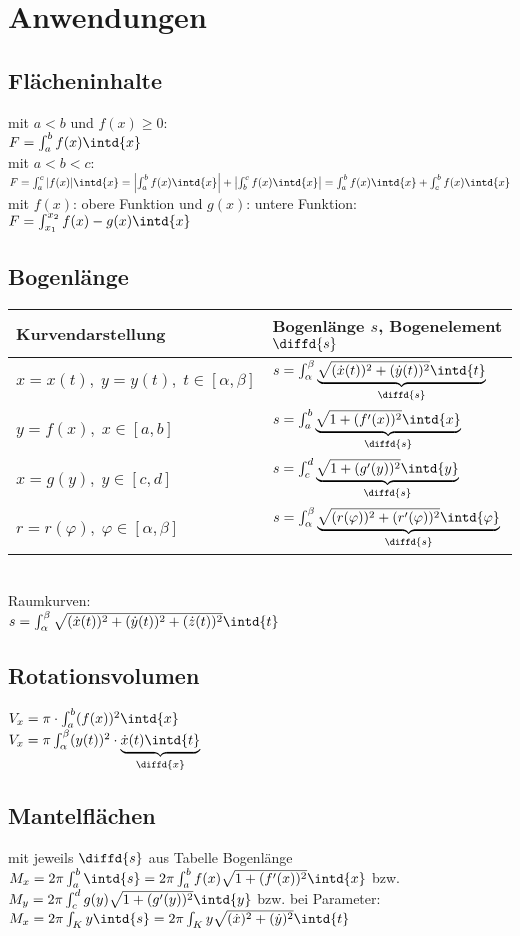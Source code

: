 \section{Anwendungen}
\subsection{Flächeninhalte}
mit $a<b$ und $f(x) \geq 0$:\\
$F=\int_a^b f(x) \intd{x}$\\
mit $a<b<c$:\\
$F=\int_a^c |f(x)| \intd{x}=\left| \int_a^b f(x) \intd{x}\right| + \left| \int_b^c f(x) \intd{x}\right|= \int_a^b f(x) \intd{x} + \int_c^b f(x) \intd{x}$\\
mit $f(x)$: obere Funktion und $g(x)$: untere Funktion:\\
$F=\int_{x_1}^{x_2} f(x) - g(x) \intd{x}$
\subsection{Bogenlänge}
\begin{tabular}{l | l}
Kurvendarstellung & Bogenlänge $s$, Bogenelement $\diffd{s}$\\ 
\hline
$x=x(t),\; y=y(t),\; t \in [\alpha,\beta]$ & $s= \int_{\alpha}^{\beta} \underbrace{\sqrt{(\dot{x}(t))^2+(\dot{y}(t))^2}\intd{t}}_{\diffd{s}}$\\
$y =f(x),\; x\in [a,b]$ & $s=\int_a^b\underbrace{\sqrt{1+(f'(x))^2}\intd{x}}_{\diffd{s}}$\\
$x= g(y), \; y \in [c,d] $ & $s=\int_c^d\underbrace{\sqrt{1+(g'(y))^2}\intd{y}}_{\diffd{s}}$\\
$r=r(\varphi), \; \varphi\in [\alpha, \beta]$ & $s=\int_{\alpha}^{\beta}\underbrace{\sqrt{(r(\varphi))^2+(r'(\varphi))^2}\intd{\varphi}}_{\diffd{s}}$
\end{tabular}\\
Raumkurven:\\
$s=\int_{\alpha}^{\beta} \sqrt{(\dot{x}(t))^2+(\dot{y}(t))^2+(\dot{z}(t))^2}\intd{t}$
\subsection{Rotationsvolumen}
$V_x = \pi \cdot \int_a^b(f(x))^2\intd{x}$\\
$V_x=\pi \int_{\alpha}^{\beta} (y(t))^2\cdot \underbrace{\dot{x}(t) \intd{t}}_{\diffd{x}}$
\subsection{Mantelflächen}
mit jeweils $\diffd{s}$ aus Tabelle Bogenlänge\\
$M_x=2\pi \int_a^b \intd{s}=2\pi \int_a^b f(x) \sqrt{1+(f'(x))^2}\intd{x}$ bzw.\\
$M_y=2\pi \int_c^d g(y) \sqrt{1+(g'(y))^2}\intd{y}$ bzw. bei Parameter:\\
$M_x=2\pi \int_K y\intd{s}=2\pi \int_K y \sqrt{(\dot{x})^2+(\dot{y}	)^2}\intd{t}$

